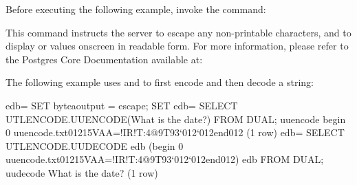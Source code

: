\documentclass[letterpaper,10pt,english,openany,oneside]{sphinxmanual}
\begin{document}

Before executing the following example, invoke the command:
\begin{quote}

\end{quote}

This command instructs the server to escape any non-printable
characters, and to display  or  values onscreen in readable
form. For more information, please refer to the Postgres Core
Documentation available at:


The following example uses  and  to first encode and
then decode a string:

%
\begin{sphinxVerbatim}[commandchars=\\\{\}]
edb=\PYGZsh{} SET bytea\PYGZus{}output = escape;
SET
edb=\PYGZsh{} SELECT UTL\PYGZus{}ENCODE.UUENCODE(\PYGZsq{}What is the date?\PYGZsq{}) FROM DUAL;
uuencode
\PYGZhy{}\PYGZhy{}\PYGZhy{}\PYGZhy{}\PYGZhy{}\PYGZhy{}\PYGZhy{}\PYGZhy{}\PYGZhy{}\PYGZhy{}\PYGZhy{}\PYGZhy{}\PYGZhy{}\PYGZhy{}\PYGZhy{}\PYGZhy{}\PYGZhy{}\PYGZhy{}\PYGZhy{}\PYGZhy{}\PYGZhy{}\PYGZhy{}\PYGZhy{}\PYGZhy{}\PYGZhy{}\PYGZhy{}\PYGZhy{}\PYGZhy{}\PYGZhy{}\PYGZhy{}\PYGZhy{}\PYGZhy{}\PYGZhy{}\PYGZhy{}\PYGZhy{}\PYGZhy{}\PYGZhy{}\PYGZhy{}\PYGZhy{}\PYGZhy{}\PYGZhy{}\PYGZhy{}\PYGZhy{}\PYGZhy{}\PYGZhy{}\PYGZhy{}\PYGZhy{}\PYGZhy{}\PYGZhy{}\PYGZhy{}\PYGZhy{}\PYGZhy{}\PYGZhy{}\PYGZhy{}\PYGZhy{}\PYGZhy{}\PYGZhy{}\PYGZhy{}\PYGZhy{}\PYGZhy{}\PYGZhy{}\PYGZhy{}\PYGZhy{}\PYGZhy{}\PYGZhy{}\PYGZhy{}\PYGZhy{}\PYGZhy{}
begin 0 uuencode.txt\PYGZbs{}01215VAA=\PYGZdq{}!I\PYGZlt{}R!T:\PYGZam{}4@9\PYGZam{}\PYGZpc{}T93\PYGZbs{}\PYGZbs{}{}`\PYGZbs{}012{}`\PYGZbs{}012end\PYGZbs{}012
(1 row)
edb=\PYGZsh{} SELECT UTL\PYGZus{}ENCODE.UUDECODE
edb\PYGZhy{}\PYGZsh{} (\PYGZsq{}begin 0 uuencode.txt\PYGZbs{}01215VAA=\PYGZdq{}!I\PYGZlt{}R!T:\PYGZam{}4@9\PYGZam{}\PYGZpc{}T93\PYGZbs{}\PYGZbs{}{}`\PYGZbs{}012{}`\PYGZbs{}012end\PYGZbs{}012\PYGZsq{})
edb\PYGZhy{}\PYGZsh{} FROM DUAL;
uudecode
\PYGZhy{}\PYGZhy{}\PYGZhy{}\PYGZhy{}\PYGZhy{}\PYGZhy{}\PYGZhy{}\PYGZhy{}\PYGZhy{}\PYGZhy{}\PYGZhy{}\PYGZhy{}\PYGZhy{}\PYGZhy{}\PYGZhy{}\PYGZhy{}\PYGZhy{}\PYGZhy{}\PYGZhy{}
What is the date?
(1 row)
\end{sphinxVerbatim}

\newpage
\end{document}
